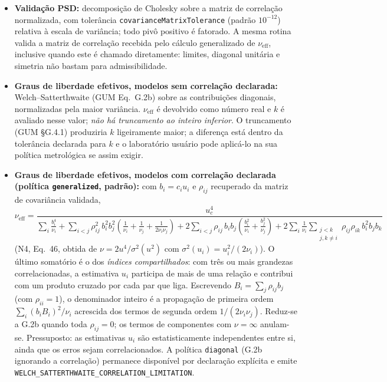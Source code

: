 \documentclass[11pt,a4paper]{article}
\begin{document}
\begin{itemize}
  \item \textbf{Validação PSD:} decomposição de Cholesky sobre a matriz de correlação normalizada, com tolerância \texttt{covarianceMatrixTolerance} (padrão \(10^{-12}\)) relativa à escala de variância; todo pivô positivo é fatorado. A mesma rotina valida a matriz de correlação recebida pelo cálculo generalizado de \(\nu_{\text{eff}}\), inclusive quando este é chamado diretamente: limites, diagonal unitária e simetria não bastam para admissibilidade.
  \item \textbf{Graus de liberdade efetivos, modelos sem correlação declarada:} Welch--Satterthwaite (GUM Eq.~G.2b) sobre as contribuições diagonais, normalizadas pela maior variância. \(\nu_{\text{eff}}\) é devolvido como número real e \(k\) é avaliado nesse valor; \emph{não há truncamento ao inteiro inferior}. O truncamento (GUM §G.4.1) produziria \(k\) ligeiramente maior; a diferença está dentro da tolerância declarada para \(k\) e o laboratório usuário pode aplicá-lo na sua política metrológica se assim exigir.
  \item \textbf{Graus de liberdade efetivos, modelos com correlação declarada (política \texttt{generalized}, padrão):} com \(b_i = c_i u_i\) e \(\rho_{ij}\) recuperado da matriz de covariância validada,
  \begin{equation*}
    \nu_{\text{eff}} = \frac{u_c^4}{\displaystyle \sum_i \frac{b_i^4}{\nu_i}
      + \sum_{i<j} \rho_{ij}^2\, b_i^2 b_j^2 \left(\frac{1}{\nu_i} + \frac{1}{\nu_j} + \frac{1}{2\nu_i\nu_j}\right)
      + 2 \sum_{i<j} \rho_{ij}\, b_i b_j \left(\frac{b_i^2}{\nu_i} + \frac{b_j^2}{\nu_j}\right)
      + 2 \sum_i \frac{1}{\nu_i} \sum_{\substack{j<k \\ j,k \neq i}} \rho_{ij}\rho_{ik}\, b_i^2 b_j b_k}
  \end{equation*}
  (N4, Eq.~46, obtida de \(\nu = 2u^4/\sigma^2(u^2)\) com \(\sigma^2(u_i) = u_i^2/(2\nu_i)\)). O último somatório é o dos \emph{índices compartilhados}: com três ou mais grandezas correlacionadas, a estimativa \(u_i\) participa de mais de uma relação e contribui com um produto cruzado por cada par que liga. Escrevendo \(B_i = \sum_j \rho_{ij} b_j\) (com \(\rho_{ii} = 1\)), o denominador inteiro é a propagação de primeira ordem \(\sum_i (b_i B_i)^2/\nu_i\) acrescida dos termos de segunda ordem \(1/(2\nu_i\nu_j)\). Reduz-se a G.2b quando toda \(\rho_{ij} = 0\); os termos de componentes com \(\nu = \infty\) anulam-se. Pressuposto: as estimativas \(u_i\) são estatisticamente independentes entre si, ainda que os erros sejam correlacionados. A política \texttt{diagonal} (G.2b ignorando a correlação) permanece disponível por declaração explícita e emite \texttt{WELCH\_SATTERTHWAITE\_CORRELATION\_LIMITATION}.

\end{itemize}
\end{document}

